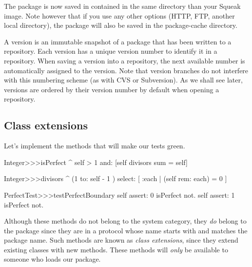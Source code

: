 \documentclass[a4paper,10pt,twoside]{book}
\begin{document}
The  package is now saved in  contained in the same directory than your Squeak image. Note however that if you use any other options (HTTP, FTP, another local directory), the package will also be saved in the package-cache directory. 



A version is an immutable snapshot of a package that has been written to a repository. Each version has a unique version number to identify it in a repository. When saving a version into a repository, the next available number is automatically assigned to the version. Note that version branches do not interfere with this numbering scheme (as with CVS or Subversion). As we shall see later, versions are ordered by their version number by default when opening a repository.

\subsection{Class extensions}

Let's implement the methods that will make our tests green.


\begin{code}{}
Integer>>>isPerfect
	^ self > 1 and: [self divisors sum = self]

Integer>>>divisors
	^ (1 to: self - 1 ) select: [ :each | (self rem: each) = 0 ]

PerfectTest>>>testPerfectBoundary
	self assert: 0 isPerfect not.
	self assert: 1 isPerfect not.
\end{code}

Although these methods do not belong to the  system category, they \emph{do} belong to the  package since they are in a protocol whose name starts with \ct{*} and matches the package name. Such methods are known as \emph{class extensions}, since they extend existing classes with new methods. These methods will \emph{only} be available to someone who loads our  package.
\end{document}
